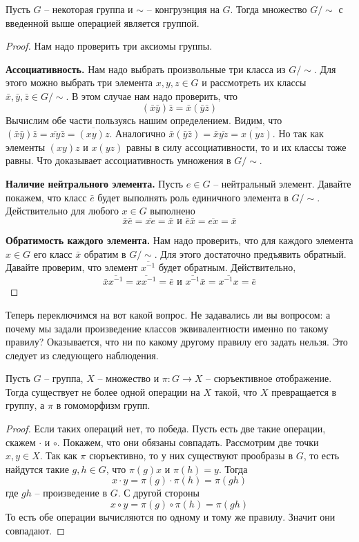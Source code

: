 \begin{claim}
\label{claim::QuotientGroupCorrectness}
Пусть $G$ -- некоторая группа и $\sim$ -- конгруэнция на $G$.
Тогда множество $G/{\sim}$ с введенной выше операцией является группой.
\end{claim}
\begin{proof}
Нам надо проверить три аксиомы группы.

\gitemreset
\gitem \textbf{Ассоциативность.}
Нам надо выбрать произвольные три класса из $G/{\sim}$.
Для этого можно выбрать три элемента $x,y,z\in G$ и рассмотреть их классы $\bar x, \bar y, \bar z\in G/{\sim}$.
В этом случае нам надо проверить, что
\[
(\bar x \bar y) \bar z = \bar x (\bar y \bar z)
\]
Вычислим обе части пользуясь нашим определением.
Видим, что $(\bar x \bar y) \bar z = \overline{xy}\bar z = \overline{(xy)z}$.
Аналогично $\bar x (\bar y \bar z) = \bar x \overline{yz} = \overline{x(yz)}$.
Но так как элементы $(xy)z$ и $x(yz)$ равны в силу ассоциативности, то и их классы тоже равны.
Что доказывает ассоциативность умножения в $G/{\sim}$.

\gitem \textbf{Наличие нейтрального элемента.}
Пусть $e\in G$ -- нейтральный элемент.
Давайте покажем, что класс $\bar  e$ будет выполнять роль единичного элемента в $G/{\sim}$.
Действительно для любого $x\in G$ выполнено
\[
\bar x \bar e = \overline{xe} = \bar x\text{ и }\bar e \bar x = \overline{ex} = \bar x
\]

\gitem \textbf{Обратимость каждого элемента.}
Нам надо проверить, что для каждого элемента $x\in G$ его класс $\bar x$ обратим в $G/{\sim}$.
Для этого достаточно предъявить обратный.
Давайте проверим, что элемент $\overline{x^{-1}}$ будет обратным.
Действительно,
\[
\bar x \overline{x^{-1}} = \overline{x x^{-1}} = \bar e \text{ и }\overline{x^{-1}} \bar x  = \overline{x^{-1} x} = \bar e
\]
\end{proof}

Теперь переключимся на вот какой вопрос.
Не задавались ли вы вопросом: а почему мы задали произведение классов эквивалентности именно по такому правилу?
Оказывается, что ни по какому другому правилу его задать нельзя.
Это следует из следующего наблюдения.

\begin{claim}
\label{claim::AtMostOneOperationOnQuotient}
Пусть $G$ -- группа, $X$ -- множество и $\pi \colon G\to X$ -- сюръективное отображение.
Тогда существует не более одной операции на $X$ такой, что $X$ превращается в группу, а $\pi$ в гомоморфизм групп.
\end{claim}
\begin{proof}
Если таких операций нет, то победа.
Пусть есть две такие операции, скажем $\cdot$ и $\circ$.
Покажем, что они обязаны совпадать.
Рассмотрим две точки $x, y\in X$.
Так как $\pi$ сюръективно, то у них существуют прообразы в $G$, то есть найдутся такие $g,h\in G$, что $\pi(g) x$ и $\pi(h) = y$.
Тогда
\[
x\cdot y = \pi(g) \cdot \pi(h) = \pi(g h)
\]
где $gh$ -- произведение в $G$.
С другой стороны
\[
x \circ y = \pi(g) \circ \pi(h) = \pi(gh)
\]
То есть обе операции вычисляются по одному и тому же правилу.
Значит они совпадают.
\end{proof}

